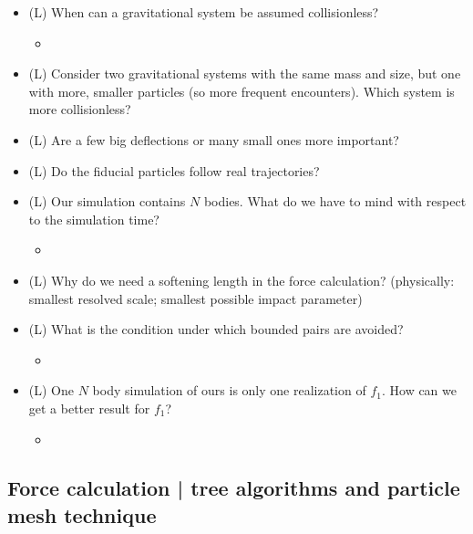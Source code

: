 \begin{itemize}
    \item (L) When can a gravitational system be assumed collisionless?
    \begin{itemize}
        \item {}
    \end{itemize}
    \item (L) Consider two gravitational systems with the same mass and size, but one with more, smaller particles (so more frequent encounters).
    Which system is more collisionless?
    \item (L) Are a few big deflections or many small ones more important?
    \item (L) Do the fiducial particles follow real trajectories?
    \item (L) Our simulation contains $N$ bodies. What do we have to mind with respect to the simulation time?
    \begin{itemize}
        \item {}
    \end{itemize}
    \item (L) Why do we need a softening length in the force calculation? (physically: smallest resolved scale; smallest possible impact parameter)
    \item (L) What is the condition under which bounded pairs are avoided?
    \begin{itemize}
        \item {}
    \end{itemize}
    \item (L) One $N$ body simulation of ours is only one realization of $f_1$. How can we get
    a better result for $f_1$?
    \begin{itemize}
        \item {}
    \end{itemize}
\end{itemize}

\subsection*{Force calculation | tree algorithms and particle mesh technique}

